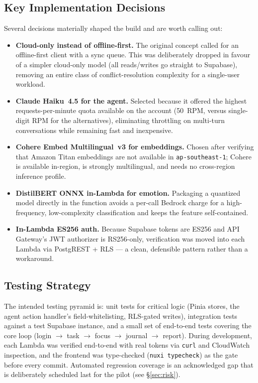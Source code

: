 \documentclass[a4paper,11pt]{article}
\begin{document}
	\subsection{Key Implementation Decisions}
	Several decisions materially shaped the build and are worth calling out:
	\begin{itemize}
		\item \textbf{Cloud-only instead of offline-first.} The original concept called for an
		      offline-first client with a sync queue. This was deliberately dropped in favour of
		      a simpler cloud-only model (all reads/writes go straight to Supabase), removing an
		      entire class of conflict-resolution complexity for a single-user workload.
		\item \textbf{Claude Haiku~4.5 for the agent.} Selected because it offered the highest
		      requests-per-minute quota available on the account (50~RPM, versus single-digit RPM
		      for the alternatives), eliminating throttling on multi-turn conversations while
		      remaining fast and inexpensive.
		\item \textbf{Cohere Embed Multilingual~v3 for embeddings.} Chosen after verifying that
		      Amazon Titan embeddings are not available in \texttt{ap-southeast-1}; Cohere is
		      available in-region, is strongly multilingual, and needs no cross-region inference
		      profile.
		\item \textbf{DistilBERT ONNX in-Lambda for emotion.} Packaging a quantized model
		      directly in the function avoids a per-call Bedrock charge for a
		      high-frequency, low-complexity classification and keeps the feature self-contained.
		\item \textbf{In-Lambda ES256 auth.} Because Supabase tokens are ES256 and API Gateway's
		      JWT authorizer is RS256-only, verification was moved into each Lambda via PostgREST
		      + RLS --- a clean, defensible pattern rather than a workaround.
	\end{itemize}

	\subsection{Testing Strategy}
	The intended testing pyramid is: unit tests for critical logic (Pinia stores, the agent
	action handler's field-whitelisting, RLS-gated writes), integration tests against a test
	Supabase instance, and a small set of end-to-end tests covering the core loop
	(login \(\rightarrow\) task \(\rightarrow\) focus \(\rightarrow\) journal \(\rightarrow\)
	report). During development, each Lambda was verified end-to-end with real tokens via
	\texttt{curl} and CloudWatch inspection, and the frontend was type-checked
	(\texttt{nuxi typecheck}) as the gate before every commit. Automated regression coverage is
	an acknowledged gap that is deliberately scheduled last for the pilot (see \S\ref{sec:risk}).
\end{document}
